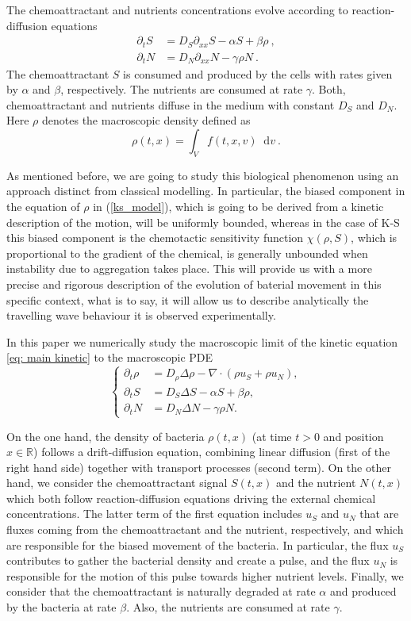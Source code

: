 \documentclass[11pt,twoside]{article}
\newcommand*\diff{\mathop{}\!\mathrm{d}}
\theoremstyle{plain}
\theoremstyle{nonumberplain}
\begin{document}
 


The chemoattractant and nutrients concentrations evolve according to  reaction-diffusion equations
\begin{align}
    \partial_t S&=D_S\partial_{xx}S-\alpha S+\beta \rho\ ,\\
    \partial_t N&=D_N\partial_{xx}N-\gamma\rho N\ .
\end{align}
The chemoattractant $S$ is consumed and produced by the cells with rates given by $\alpha$ and $\beta$, respectively. The nutrients are consumed at rate $\gamma$. Both, chemoattractant and nutrients diffuse in the medium with constant $D_S$ and $D_N$. Here $\rho$ denotes the macroscopic density defined as
\[
\rho(t,x)=\int_Vf(t,x,v)\diff v\ .
\]

As mentioned before, we are going to study this biological phenomenon using an approach distinct from classical modelling. In particular, the biased component in the equation of $\rho$ in (\ref{ks_model}), which is going to be derived from a kinetic description of the motion, will be uniformly bounded, whereas in the case of K-S this biased component is the chemotactic sensitivity function $\chi(\rho, S)$, which is proportional to the gradient of the chemical, is generally unbounded when instability due to aggregation takes place. This will provide us with a more precise and rigorous description of the evolution of baterial movement in this specific context, what is to say, it will allow us to describe analytically the travelling wave behaviour it is observed experimentally.

In this paper we numerically study the macroscopic limit of the kinetic equation \eqref{eq: main kinetic} to the macroscopic PDE
\begin{equation}
  \left \{
    \begin{aligned}
       \partial_t \rho &= D_\rho \Delta \rho - \nabla \cdot (\rho u_S + \rho u_N),\\
       \partial_t S &= D_S \Delta S - \alpha S + \beta \rho,\\
        \partial_t N &= D_N \Delta N - \gamma \rho N.
    \end{aligned}
  \right .
  \label{basicmodel}
\end{equation}

On the one hand, the density of bacteria $\rho(t, x)$ (at time $t>0$ and position $x \in \mathbb{R} $) follows a drift-diffusion equation, combining linear diffusion (first of the right hand side) together with transport processes (second term). On the other hand, we consider the chemoattractant signal $S(t,x)$ and the nutrient $N(t,x)$ which both follow reaction-diffusion equations driving the external chemical concentrations. The latter term of the first equation includes $u_S$ and $u_N$ that are fluxes coming from the chemoattractant and the nutrient, respectively, and which are responsible for the biased movement of the bacteria. In particular, the flux $u_S$ contributes to gather the bacterial density and create a pulse, and the flux $u_N$ is responsible for the motion of this pulse towards higher nutrient levels.
Finally, we consider that the chemoattractant is naturally degraded at rate $\alpha$ and produced by the bacteria at rate $\beta$. Also, the nutrients are consumed at rate $\gamma$. 
\end{document}
